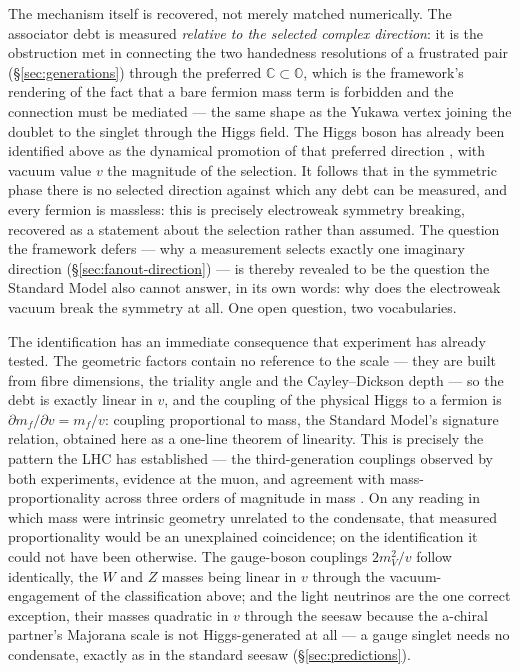 The mechanism itself is recovered, not merely matched numerically. The associator debt is measured
\emph{relative to the selected complex direction}: it is the obstruction met in connecting the two
handedness resolutions of a frustrated pair (\S\ref{sec:generations}) through the preferred
$\mathbb{C} \subset \mathbb{O}$, which is the framework's rendering of the fact that a bare fermion
mass term is forbidden and the connection must be mediated --- the same shape as the Yukawa vertex
joining the doublet to the singlet through the Higgs field. The Higgs boson has already been
identified above as the dynamical promotion of that preferred direction
\autocite{szangolies2025standardmodel}, with vacuum value $v$ the magnitude of the selection. It
follows that in the symmetric phase there is no selected direction against which any debt can be
measured, and every fermion is massless: this is precisely electroweak symmetry breaking, recovered
as a statement about the selection rather than assumed. The question the framework defers --- why a
measurement selects exactly one imaginary direction (\S\ref{sec:fanout-direction}) --- is thereby
revealed to be the question the Standard Model also cannot answer, in its own words: why does the
electroweak vacuum break the symmetry at all. One open question, two vocabularies.

The identification has an immediate consequence that experiment has already tested. The geometric
factors contain no reference to the scale --- they are built from fibre dimensions, the triality
angle and the Cayley--Dickson depth --- so the debt is exactly linear in $v$, and the coupling of the
physical Higgs to a fermion is $\partial m_f/\partial v = m_f/v$: coupling proportional to mass, the
Standard Model's signature relation, obtained here as a one-line theorem of linearity. This is
precisely the pattern the LHC has established --- the third-generation couplings observed by both
experiments, evidence at the muon, and agreement with mass-proportionality across three orders of
magnitude in mass \autocite{atlas2022higgs,cms2022higgs}. On any reading in which mass were intrinsic
geometry unrelated to the condensate, that measured proportionality would be an unexplained
coincidence; on the identification it could not have been otherwise. The gauge-boson couplings
$2m_V^2/v$ follow identically, the $W$ and $Z$ masses being linear in $v$ through the
vacuum-engagement of the classification above; and the light neutrinos are the one correct exception,
their masses quadratic in $v$ through the seesaw because the a-chiral partner's Majorana scale is not
Higgs-generated at all --- a gauge singlet needs no condensate, exactly as in the standard seesaw
(\S\ref{sec:predictions}).

